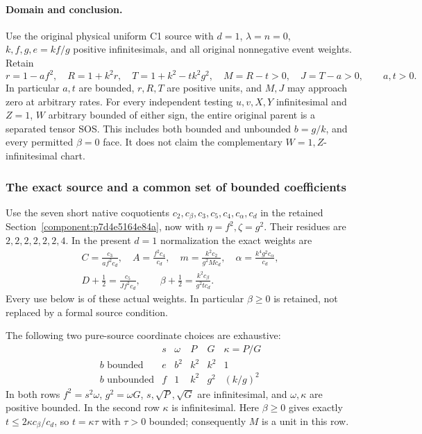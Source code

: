 \paragraph{Domain and conclusion.}
Use the original physical uniform C1 source with $d=1$,
$\lambda=n=0$, $k,f,g,e=kf/g$ positive infinitesimals, and
all original nonnegative event weights. Retain
\[
 r=1-af^2,\quad R=1+k^2r,\quad
 T=1+k^2-tk^2g^2,\quad M=R-t>0,\quad J=T-a>0,
 \qquad a,t>0.                                                   \tag{EZ1}
\]
In particular $a,t$ are bounded, $r,R,T$ are positive units,
and $M,J$ may approach zero at arbitrary rates.
For every independent testing $u,v,X,Y$ infinitesimal and
$Z=1$, $W$ arbitrary bounded of either sign, the entire original
parent is a separated tensor SOS. This includes both bounded
and unbounded $b=g/k$, and every permitted $\beta=0$ face.
It does not claim the complementary $W=1,Z$-infinitesimal chart.

\subsubsection*{The exact source and a common set of bounded coefficients}

Use the seven short native coquotients
$c_2,c_\beta,c_3,c_5,c_4,c_\alpha,c_d$ in the retained
Section~\ref{component:p7d4e5164e84a}, now with $\eta=f^2,\zeta=g^2$.
Their residues are $2,2,2,2,2,2,4$.
In the present $d=1$ normalization the exact weights are
\[
\begin{gathered}
 C=\frac{c_3}{af^2c_d},\quad A=\frac{f^2c_4}{c_d},\quad
 m=\frac{k^2c_2}{g^2Mc_d},\quad
 \alpha=\frac{k^4g^2c_\alpha}{c_d},\\
 D+\tfrac12=\frac{c_5}{Jf^2c_d},\qquad
 \beta+\tfrac12=\frac{k^2c_\beta}{g^2tc_d}.
\end{gathered}                                                   \tag{EZ2}
\]
Every use below is of these actual weights. In particular
$\beta\geq0$ is retained, not replaced by a formal source condition.

The following two pure-source coordinate choices are exhaustive:
\[
\begin{array}{c|ccccc}
 &s&\omega&P&G&\kappa=P/G\\ \hline
 b\text{ bounded}&e&b^2&k^2&k^2&1\\
 b\text{ unbounded}&f&1&k^2&g^2&(k/g)^2
\end{array}                                                     \tag{EZ3}
\]
In both rows $f^2=s^2\omega$, $g^2=\omega G$,
$s,\sqrt P,\sqrt G$ are infinitesimal, and $\omega,\kappa$
are positive bounded. In the second row $\kappa$ is infinitesimal.
Here $\beta\geq0$ gives exactly
$t\leq2\kappa c_\beta/c_d$, so $t=\kappa\tau$ with
$\tau>0$ bounded; consequently $M$ is a unit in this row.

